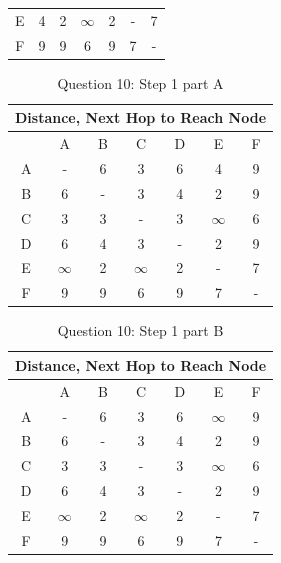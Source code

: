 \documentclass[12pt,addpoints,answers]{exam}
\begin{document}
\begin{questions}
\begin{solution}[5in]
\begin{table}[H]
\begin{tabular}{|c|c|c|c|c|c|c|}
		E    & 4   & 2   & $\infty$   & 2   & -          & 7   \\
		F    & 9   & 9   & 6          & 9   & 7          & -  \\ \hline
	\end{tabular}
\end{table}
\begin{table}[H]
	\centering
	\caption{Question 10: Step 1  part A}
	\label{Solution 10}
	\begin{tabular}{|c|c|c|c|c|c|c|}
		\hline
		\multicolumn{7}{|c|}{Distance, Next Hop to Reach Node} \\ \hline
	   		 & A   & B   & C       & D     & E   & F   				\\ \hline
		A    & -   & 6   & 3          & 6   & 4          & 9   \\
		B    & 6   & -   & 3          & 4   & 2          & 9   \\
		C    & 3   & 3   & -          & 3   & $\infty$   & 6   \\
		D    & 6   & 4   & 3          & -   & 2          & 9   \\
		E    & $\infty$   & 2   & $\infty$   & 2   & -          & 7   \\
		F    & 9   & 9   & 6          & 9   & 7          & -  \\ \hline
	\end{tabular}
\end{table}
\begin{table}[H]
	\centering
	\caption{Question 10: Step 1  part B}
	\label{Solution 10}
	\begin{tabular}{|c|c|c|c|c|c|c|}
		\hline
		\multicolumn{7}{|c|}{Distance, Next Hop to Reach Node} \\ \hline
		& A   & B   & C       & D     & E   & F   				\\ \hline
		A    & -   & 6   & 3          & 6   & $\infty$          & 9   \\
		B    & 6   & -   & 3          & 4   & 2          & 9   \\
		C    & 3   & 3   & -          & 3   & $\infty$   & 6   \\
		D    & 6   & 4   & 3          & -   & 2          & 9   \\
		E    & $\infty$   & 2   & $\infty$   & 2   & -          & 7   \\
		F    & 9   & 9   & 6          & 9   & 7          & -  \\ \hline
	\end{tabular}
\end{table}
\begin{table}[H]

\end{table}
\end{solution}
\end{questions}
\end{document}
